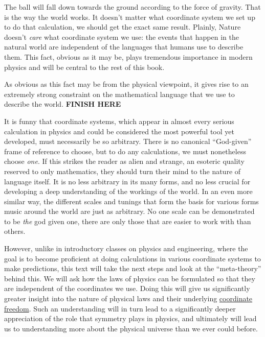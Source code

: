 \documentclass[../master.tex]{subfiles}
\begin{document}
	The ball will fall down towards the ground according to the force of gravity. That is the way the world works. It doesn't matter what coordinate system we set up to do that calculation, we should get the exact same result. Plainly, Nature doesn't \emph{care} what coordinate system we use: the events that happen in the natural world are independent of the languages that humans use to describe them. This fact, obvious as it may be, plays tremendous importance in modern physics and will be central to the rest of this book.
	
	As obvious as this fact may be from the physical viewpoint, it gives rise to an extremely strong constraint on the mathematical language that we use to describe the world. \textbf{FINISH HERE}
	
	
	It is funny that coordinate systems, which appear in almost every serious calculation in physics and could be considered the most powerful tool yet developed, must necessarily be so arbitrary. There is no canonical ``God-given'' frame of reference to choose, but to do any calculations, we must nonetheless choose \emph{one}. If this strikes the reader as alien and strange, an esoteric quality reserved to only mathematics, they should turn their mind to the nature of language itself. It is no less arbitrary in its many forms, and no less crucial for developing a deep understanding of the workings of the world. In an even more similar way, the different scales and tunings that form the basis for various forms music around the world are just as arbitrary. No one scale can be demonstrated to be \emph{the} god given one, there are only those that are easier to work with than others.
	
	However, unlike in introductory classes on physics and engineering, where the goal is to become proficient at doing calculations in various coordinate systems to make predictions, this text will take the next steps and look at the ``meta-theory'' behind this. We will ask how the laws of physics can be formulated so that they are independent of the coordinates we use. Doing this will give us significantly greater insight into the nature of physical laws and their underlying \ul{coordinate freedom}.
	Such an understanding will in turn lead to a significantly deeper appreciation of the role that symmetry plays in physics, and ultimately will lead us to understanding more about the physical universe than we ever could before.
	
\end{document}

